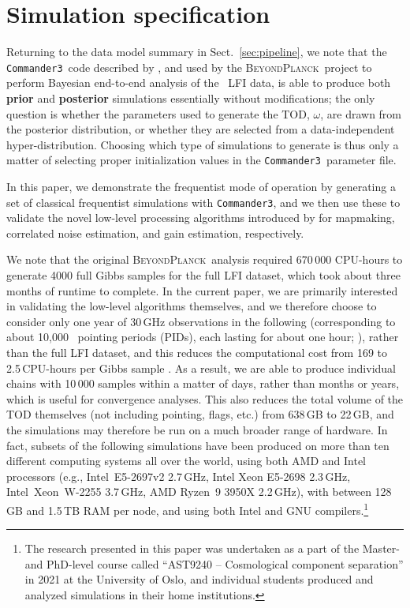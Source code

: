 \documentclass[twocolumn]{aa}%
\def\commanderthree{\texttt{Commander3}}
\newcommand{\BP}{\textsc{BeyondPlanck}}
\begin{document}
\section{Simulation specification}
\label{sec:simulation}



Returning to the data model summary in Sect.~\ref{sec:pipeline}, we
note that the \commanderthree\ code described by \citet{bp03}, and
used by the \BP\ project to perform Bayesian end-to-end analysis of
the \Planck\ LFI data, is able to produce both {\bf prior} and
{\bf posterior} simulations essentially without modifications; the only
question is whether the parameters used to generate the TOD, $\omega$,
are drawn from the posterior distribution, or whether they are
selected from a data-independent hyper-distribution. Choosing which
type of simulations to generate is thus only a matter of selecting
proper initialization values in the \commanderthree\ parameter file.

In this paper, we demonstrate the frequentist mode of operation by generating a set of classical frequentist simulations with
\commanderthree, and we then use these to validate the novel
low-level processing algorithms introduced by \citet{bp02,bp06,bp07}
for mapmaking, correlated noise estimation, and gain estimation,
respectively. 

We note that the original \BP\ analysis required 670\,000 CPU-hours to
generate 4000 full Gibbs samples for the full LFI dataset, which took
about three months of runtime to complete. In the current paper, we
are primarily interested in validating the low-level algorithms
themselves, and we therefore choose to consider only one year of
30\,GHz observations in the following (corresponding to about 10,000
\Planck\ pointing periods (PIDs), each lasting for about one hour;
\citealp{planck2013-p01}), rather than the full LFI dataset, and this
reduces the computational cost from 169 to 2.5\,CPU-hours per Gibbs
sample \citep{bp03}. As a result, we are able to produce individual
chains with 10\,000 samples within a matter of days, rather than
months or years, which is useful for convergence analyses. This also
reduces the total volume of the TOD themselves (not including
pointing, flags, etc.) from 638\,GB to 22\,GB, and the simulations may
therefore be run on a much broader range of hardware. In fact, subsets
of the following simulations have been produced on more than ten
different computing systems all over the world, using both AMD and
Intel processors (e.g., Intel~E5-2697v2 2.7\,GHz, Intel Xeon E5-2698
2.3\,GHz, Intel~Xeon~W-2255 3.7\,GHz, AMD Ryzen~9 3950X 2.2\,GHz),
with between 128\,GB and 1.5\,TB RAM per node, and using both Intel
and GNU compilers.\footnote{The research presented in this paper was
  undertaken as a part of the Master- and PhD-level course called
  ``AST9240 -- Cosmological component separation'' in 2021 at the
  University of Oslo, and individual students produced and analyzed
  simulations in their home institutions.}
\end{document}
